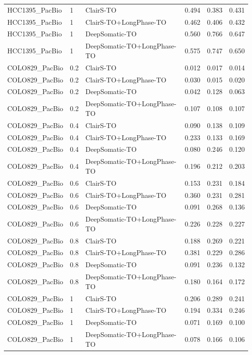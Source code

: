 \documentclass[pdflatex,sn-nature]{sn-jnl}
\begin{document}
{\begin{longtable}{@{}lllccc@{}}
  HCC1395\_PacBio & 1 & ClairS-TO & 0.494 & 0.383 & 0.431 \\
  HCC1395\_PacBio & 1 & ClairS-TO+LongPhase-TO & 0.462 & 0.406 & 0.432 \\
  HCC1395\_PacBio & 1 & DeepSomatic-TO & 0.560 & 0.766 & 0.647 \\
  HCC1395\_PacBio & 1 & DeepSomatic-TO+LongPhase-TO & 0.575 & 0.747 & 0.650 \\
  \addlinespace
  COLO829\_PacBio & 0.2 & ClairS-TO & 0.012 & 0.017 & 0.014 \\
  COLO829\_PacBio & 0.2 & ClairS-TO+LongPhase-TO & 0.030 & 0.015 & 0.020 \\
  COLO829\_PacBio & 0.2 & DeepSomatic-TO & 0.042 & 0.128 & 0.063 \\
  COLO829\_PacBio & 0.2 & DeepSomatic-TO+LongPhase-TO & 0.107 & 0.108 & 0.107 \\
  COLO829\_PacBio & 0.4 & ClairS-TO & 0.090 & 0.138 & 0.109 \\
  COLO829\_PacBio & 0.4 & ClairS-TO+LongPhase-TO & 0.233 & 0.133 & 0.169 \\
  COLO829\_PacBio & 0.4 & DeepSomatic-TO & 0.080 & 0.246 & 0.120 \\
  COLO829\_PacBio & 0.4 & DeepSomatic-TO+LongPhase-TO & 0.196 & 0.212 & 0.203 \\
  COLO829\_PacBio & 0.6 & ClairS-TO & 0.153 & 0.231 & 0.184 \\
  COLO829\_PacBio & 0.6 & ClairS-TO+LongPhase-TO & 0.360 & 0.231 & 0.281 \\
  COLO829\_PacBio & 0.6 & DeepSomatic-TO & 0.091 & 0.268 & 0.136 \\
  COLO829\_PacBio & 0.6 & DeepSomatic-TO+LongPhase-TO & 0.226 & 0.228 & 0.227 \\
  COLO829\_PacBio & 0.8 & ClairS-TO & 0.188 & 0.269 & 0.221 \\
  COLO829\_PacBio & 0.8 & ClairS-TO+LongPhase-TO & 0.381 & 0.229 & 0.286 \\
  COLO829\_PacBio & 0.8 & DeepSomatic-TO & 0.091 & 0.236 & 0.132 \\
  COLO829\_PacBio & 0.8 & DeepSomatic-TO+LongPhase-TO & 0.180 & 0.164 & 0.172 \\
  COLO829\_PacBio & 1 & ClairS-TO & 0.206 & 0.289 & 0.241 \\
  COLO829\_PacBio & 1 & ClairS-TO+LongPhase-TO & 0.194 & 0.334 & 0.246 \\
  COLO829\_PacBio & 1 & DeepSomatic-TO & 0.071 & 0.169 & 0.100 \\
  COLO829\_PacBio & 1 & DeepSomatic-TO+LongPhase-TO & 0.078 & 0.166 & 0.106 \\

\end{longtable}}
\end{document}
